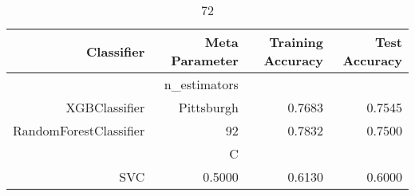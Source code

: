 
\begin{table}[H]
    \caption{72}
    \centering
    \begin{tabular}{|r|r|r|r|}
        \hline
        Classifier &Meta Parameter &Training Accuracy
        &Test Accuracy\\
        \hline
        &n\_estimators &\multicolumn{2}{|r|}{}\\
        \hline
        XGBClassifier &Pittsburgh &0.7683 &0.7545\\
        \hline
        RandomForestClassifier &92 &0.7832 &0.7500\\
        \hline
        &C &\multicolumn{2}{|r|}{}\\
        \hline
        SVC &0.5000 &0.6130 &0.6000\\
        \hline
    \end{tabular}
\end{table}
